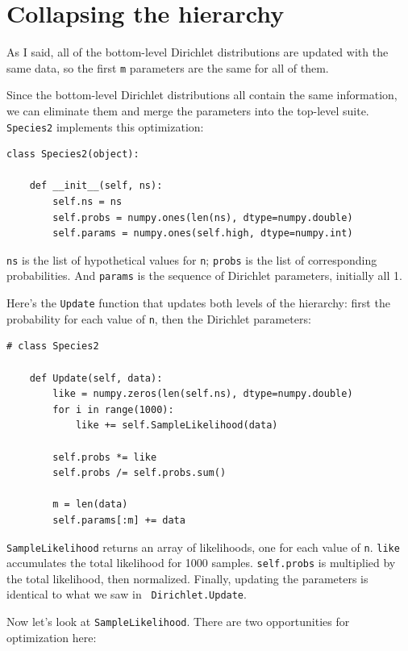 \documentclass[12pt]{book}
\begin{document}
\section{Collapsing the hierarchy}
\label{collapsing}

As I said, all of the bottom-level Dirichlet distributions are updated
with the same data, so the first {\tt m} parameters are the same for
all of them.

Since the bottom-level Dirichlet distributions all contain the same
information, we can eliminate them and merge the parameters into
the top-level suite.  {\tt Species2} implements this optimization:

\begin{verbatim}
class Species2(object):
    
    def __init__(self, ns):
        self.ns = ns
        self.probs = numpy.ones(len(ns), dtype=numpy.double)
        self.params = numpy.ones(self.high, dtype=numpy.int)
\end{verbatim}

{\tt ns} is the list of hypothetical values for {\tt n};
{\tt probs} is the list of corresponding probabilities.  And
{\tt params} is the sequence of Dirichlet parameters, initially
all 1.

Here's the {\tt Update} function that updates both levels of
the hierarchy: first the probability for each value of {\tt n},
then the Dirichlet parameters:

\begin{verbatim}
# class Species2

    def Update(self, data):
        like = numpy.zeros(len(self.ns), dtype=numpy.double)
        for i in range(1000):
            like += self.SampleLikelihood(data)

        self.probs *= like
        self.probs /= self.probs.sum()

        m = len(data)
        self.params[:m] += data
\end{verbatim}

{\tt SampleLikelihood} returns an array of likelihoods, one for
each value of {\tt n}.  {\tt like} accumulates the total likelihood
for 1000 samples.  {\tt self.probs}
is multiplied by the total likelihood, then normalized.
Finally, updating the parameters is identical to what we saw in {\tt
  Dirichlet.Update}.

Now let's look at {\tt SampleLikelihood}.  There are two
opportunities for optimization here:
\end{document}
